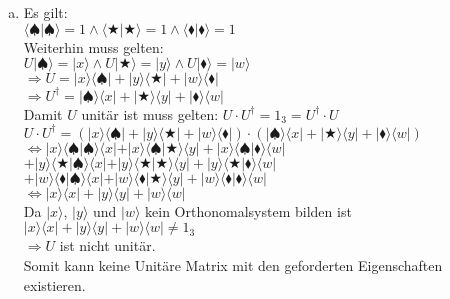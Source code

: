 \documentclass[a4paper]{scrartcl}
\begin{document}
\begin{enumerate}[a)]
\item 
Es gilt:\\
$\langle \spadesuit | \spadesuit\rangle =1 \wedge \langle \bigstar | \bigstar \rangle=1 \wedge \langle \blacklozenge | \blacklozenge\rangle =1$\\
Weiterhin muss gelten:\\
$U|\spadesuit\rangle=|x\rangle \wedge U|\bigstar\rangle=|y\rangle \wedge U|\blacklozenge\rangle=|w\rangle$\\
$\Rightarrow U=|x\rangle\langle\spadesuit|+|y\rangle\langle\bigstar|+|w\rangle\langle\blacklozenge|$\\
$\Rightarrow U^\dagger= |\spadesuit\rangle\langle x|+|\bigstar\rangle\langle y|+|\blacklozenge\rangle\langle w|$\\
Damit $U$ unitär ist muss gelten: $U\cdot U^\dagger=1_3=U^\dagger\cdot U$\\
$U\cdot U^\dagger = (|x\rangle\langle\spadesuit|+|y\rangle\langle\bigstar|+|w\rangle\langle\blacklozenge|)\cdot(|\spadesuit\rangle\langle x|+|\bigstar\rangle\langle y|+|\blacklozenge\rangle\langle w|)$\\
$\Leftrightarrow |x\rangle\langle\spadesuit|\spadesuit\rangle\langle x|+|x\rangle\langle\spadesuit|\bigstar\rangle\langle y|+|x\rangle\langle\spadesuit|\blacklozenge\rangle\langle w|$\\
$+|y\rangle\langle\bigstar|\spadesuit\rangle\langle x|+|y\rangle\langle\bigstar|\bigstar\rangle\langle y|+|y\rangle\langle\bigstar|\blacklozenge\rangle\langle w|$\\
$+|w\rangle\langle\blacklozenge|\spadesuit\rangle\langle x|+|w\rangle\langle\blacklozenge|\bigstar\rangle\langle y|+|w\rangle\langle\blacklozenge|\blacklozenge\rangle\langle w|$\\
$\Leftrightarrow |x\rangle\langle x|+|y\rangle\langle y|+|w\rangle\langle w|$\\
Da $|x\rangle$, $|y\rangle$ und $|w\rangle$ kein Orthonomalsystem bilden ist $|x\rangle\langle x|+|y\rangle\langle y|+|w\rangle\langle w|\neq 1_3$\\
$\Rightarrow U$ ist nicht unitär.\\
Somit kann keine Unitäre Matrix mit den geforderten Eigenschaften existieren.


\end{enumerate}
\end{document}
